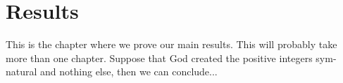 \chapter{Results}


This is the  chapter where we prove our main results. This will probably take more than one chapter. Suppose that God created the  positive integers \gls{sym-natural} and nothing else, then we can conclude...

